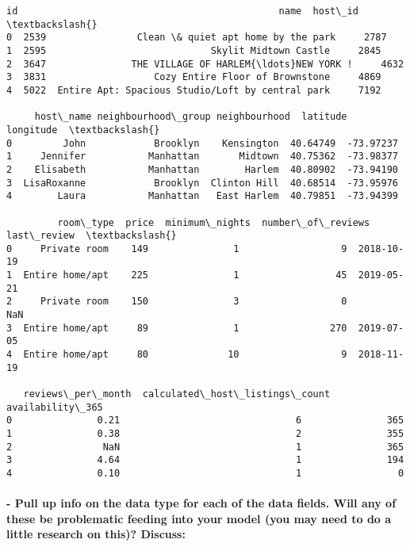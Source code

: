 \documentclass[11pt]{article}
\makeatletter
\newcommand{\boxspacing}{\kern\kvtcb@left@rule\kern\kvtcb@boxsep}
\newcommand{\prompt}[4]{
        {\ttfamily\llap{{\color{#2}[#3]:\hspace{3pt}#4}}\vspace{-\baselineskip}}
    }
\makeatother
\begin{document}
            \begin{tcolorbox}[breakable, size=fbox, boxrule=.5pt, pad at break*=1mm, opacityfill=0]
\prompt{Out}{outcolor}{ }{\boxspacing}
\begin{Verbatim}[commandchars=\\\{\}]
     id                                              name  host\_id  \textbackslash{}
0  2539                Clean \& quiet apt home by the park     2787
1  2595                             Skylit Midtown Castle     2845
2  3647               THE VILLAGE OF HARLEM{\ldots}NEW YORK !     4632
3  3831                   Cozy Entire Floor of Brownstone     4869
4  5022  Entire Apt: Spacious Studio/Loft by central park     7192

     host\_name neighbourhood\_group neighbourhood  latitude  longitude  \textbackslash{}
0         John            Brooklyn    Kensington  40.64749  -73.97237
1     Jennifer           Manhattan       Midtown  40.75362  -73.98377
2    Elisabeth           Manhattan        Harlem  40.80902  -73.94190
3  LisaRoxanne            Brooklyn  Clinton Hill  40.68514  -73.95976
4        Laura           Manhattan   East Harlem  40.79851  -73.94399

         room\_type  price  minimum\_nights  number\_of\_reviews last\_review  \textbackslash{}
0     Private room    149               1                  9  2018-10-19
1  Entire home/apt    225               1                 45  2019-05-21
2     Private room    150               3                  0         NaN
3  Entire home/apt     89               1                270  2019-07-05
4  Entire home/apt     80              10                  9  2018-11-19

   reviews\_per\_month  calculated\_host\_listings\_count  availability\_365
0               0.21                               6               365
1               0.38                               2               355
2                NaN                               1               365
3               4.64                               1               194
4               0.10                               1                 0
\end{Verbatim}
\end{tcolorbox}
        
    \hypertarget{pull-up-info-on-the-data-type-for-each-of-the-data-fields.-will-any-of-these-be-problematic-feeding-into-your-model-you-may-need-to-do-a-little-research-on-this-discuss}{%
\paragraph{- Pull up info on the data type for each of the data fields.
Will any of these be problematic feeding into your model (you may need
to do a little research on this)?
Discuss:}\label{pull-up-info-on-the-data-type-for-each-of-the-data-fields.-will-any-of-these-be-problematic-feeding-into-your-model-you-may-need-to-do-a-little-research-on-this-discuss}}
\end{document}
